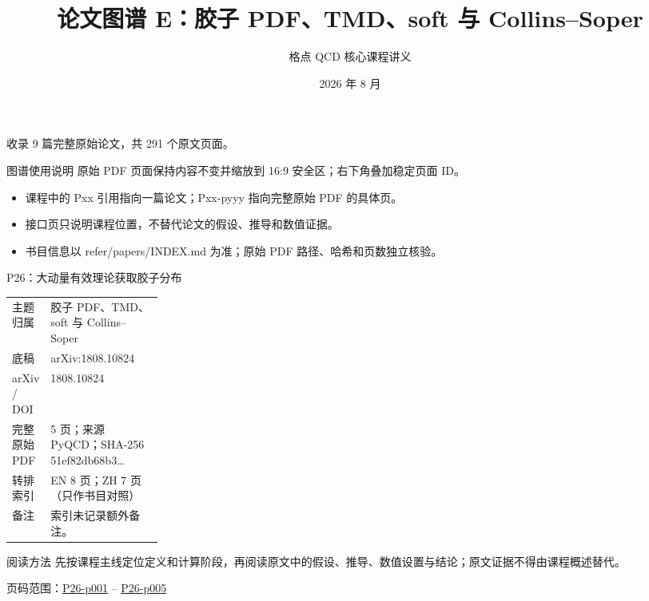\documentclass[aspectratio=169,10pt]{ctexbeamer}
\title{论文图谱 E：胶子 PDF、TMD、soft 与 Collins--Soper}
\author{格点 QCD 核心课程讲义}
\date{2026 年 8 月}
\begin{document}
\begin{frame}[plain]\titlepage
\vfill\centering 收录 9 篇完整原始论文，共 291 个原文页面。
\end{frame}
\begin{frame}[t]{图谱使用说明}
\small 原始 PDF 页面保持内容不变并缩放到 16:9 安全区；右下角叠加稳定页面 ID。
\begin{itemize}
\item 课程中的 Pxx 引用指向一篇论文；Pxx-pyyy 指向完整原始 PDF 的具体页。
\item 接口页只说明课程位置，不替代论文的假设、推导和数值证据。
\item 书目信息以 refer/papers/INDEX.md 为准；原始 PDF 路径、哈希和页数独立核验。
\end{itemize}\end{frame}
\begin{frame}[t]{P26：大动量有效理论获取胶子分布}
\small\begin{tabularx}{\linewidth}{p{0.22\linewidth}Y}
\toprule 主题归属 & 胶子 PDF、TMD、soft 与 Collins--Soper\\
底稿 & arXiv:1808.10824\\
arXiv / DOI & 1808.10824\\
完整原始 PDF & 5 页；来源 PyQCD；SHA-256 51ef82db68b3\ldots\\
转排索引 & EN 8 页；ZH 7 页（只作书目对照）\\
备注 & 索引未记录额外备注。\\
\bottomrule\end{tabularx}\vspace{0.25cm}
\begin{block}{阅读方法}
先按课程主线定位定义和计算阶段，再阅读原文中的假设、推导、数值设置与结论；原文证据不得由课程概述替代。
\end{block}
\vfill 页码范围：\hyperlink{P26-p001}{P26-p001} -- \hyperlink{P26-p005}{P26-p005}
\end{frame}
\end{document}
